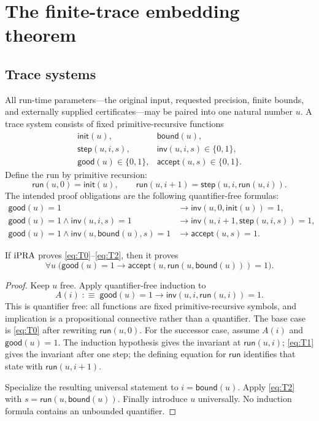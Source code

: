 \section{The finite-trace embedding theorem}
\label{sec:master}

\subsection{Trace systems}

All run-time parameters---the original input, requested precision, finite
bounds, and externally supplied certificates---may be paired into one natural
number \(u\).  A trace system consists of fixed primitive-recursive functions
\[
\begin{array}{ll}
 \mathsf{init}(u), & \mathsf{bound}(u),\\
 \mathsf{step}(u,i,s), & \mathsf{inv}(u,i,s)\in\{0,1\},\\
 \mathsf{good}(u)\in\{0,1\}, & \mathsf{accept}(u,s)\in\{0,1\}.
\end{array}
\]
Define the run by primitive recursion:
\[
 \mathsf{run}(u,0)=\mathsf{init}(u),\qquad
 \mathsf{run}(u,i+1)=\mathsf{step}(u,i,\mathsf{run}(u,i)).
\]
The intended proof obligations are the following quantifier-free formulas:
\begin{align}
 \mathsf{good}(u)=1&\to
   \mathsf{inv}(u,0,\mathsf{init}(u))=1, \tag{T0}\label{eq:T0}\\
 \mathsf{good}(u)=1\wedge \mathsf{inv}(u,i,s)=1&\to
   \mathsf{inv}(u,i+1,\mathsf{step}(u,i,s))=1, \tag{T1}\label{eq:T1}\\
 \mathsf{good}(u)=1\wedge
 \mathsf{inv}(u,\mathsf{bound}(u),s)=1&\to
   \mathsf{accept}(u,s)=1. \tag{T2}\label{eq:T2}
\end{align}

\begin{theorem}
\label{thm:trace-reflection}
If \(\mathrm{iPRA}\) proves \eqref{eq:T0}--\eqref{eq:T2}, then it proves
\[
 \forall u\;\bigl(\mathsf{good}(u)=1\to
 \mathsf{accept}(u,\mathsf{run}(u,\mathsf{bound}(u)))=1\bigr).
\]
\end{theorem}

\begin{proof}
Keep \(u\) free.  Apply quantifier-free induction to
\[
 A(i)\;:\equiv\;
 \mathsf{good}(u)=1\to
 \mathsf{inv}(u,i,\mathsf{run}(u,i))=1.
\]
This is quantifier free: all functions are fixed primitive-recursive symbols,
and implication is a propositional connective rather than a quantifier.  The
base case is \eqref{eq:T0} after rewriting \(\mathsf{run}(u,0)\).  For the
successor case, assume \(A(i)\) and \(\mathsf{good}(u)=1\).  The induction
hypothesis gives the invariant at \(\mathsf{run}(u,i)\); \eqref{eq:T1} gives
the invariant after one step; the defining equation for \(\mathsf{run}\)
identifies that state with \(\mathsf{run}(u,i+1)\).

Specialize the resulting universal statement to
\(i=\mathsf{bound}(u)\).  Apply \eqref{eq:T2} with
\(s=\mathsf{run}(u,\mathsf{bound}(u))\).  Finally introduce \(u\)
universally.  No induction formula contains an unbounded quantifier.
\end{proof}

